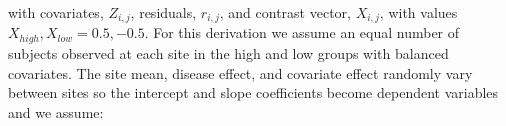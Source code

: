 with covariates, $Z_{i,j}$, residuals, $r_{i,j}$, and contrast vector, $X_{i,j}$, with values $X_{high}, X_{low} = 0.5,-0.5$. For this derivation we assume an equal number of subjects observed at each site in the high and low groups with balanced covariates. The site mean, disease effect, and covariate effect randomly vary between sites so the intercept and slope coefficients become dependent variables \cite{Raudenbush2000} and we assume: